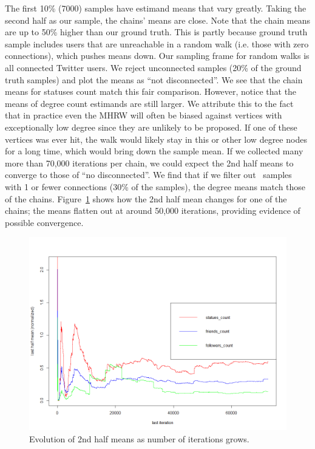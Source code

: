 The first 10\% (7000) samples have estimand means that vary greatly.
Taking the second half as our sample, the chains' means are close.
Note that the chain means are up to 50\% higher than our ground truth.
This is partly because ground truth sample includes users that are
unreachable in a random walk (i.e. those with zero connections), which
pushes means down. Our sampling frame for random walks is all
connected Twitter users. We reject unconnected samples (20\% of the ground
truth samples) and plot the means as ``not disconnected''. We see that
the chain means for statuses count match this fair comparison.
However, notice that the means of degree count estimands are still
larger. We attribute this to the fact that in practice even the MHRW
will often be biased against vertices with exceptionally low degree
since they are unlikely to be proposed. If one of these vertices was ever
hit, the walk would likely stay in this or other low degree nodes for
a long time, which would bring down the sample mean. If we collected
many more than 70,000 iterations per chain, we could expect the 2nd
half means to converge to those of ``no disconnected''. We find that if
we filter out \id~samples with 1 or fewer connections (30\% of the
samples), the degree means match those of the chains.
Figure~\ref{fig:evolve} shows how the 2nd half mean changes for one of
the chains; the means flatten out at around 50,000 iterations,
providing evidence of possible convergence.

 \begin{figure}[htb]
\begin{center}
    \includegraphics[width=0.8\columnwidth]{figs/stats7_means.png}
\end{center}
\caption{Evolution of 2nd half means as number of iterations grows.}
\label{fig:evolve}
\end{figure}

